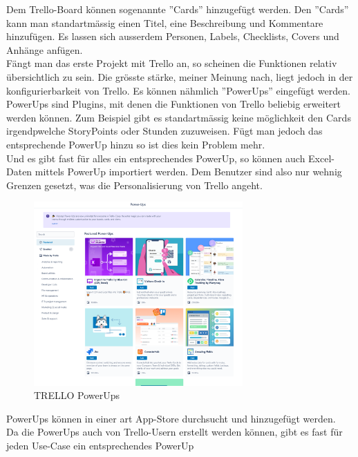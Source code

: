 Dem Trello-Board können sogenannte ''Cards'' hinzugefügt werden. Den ''Cards'' kann man standartmässig
einen Titel, eine Beschreibung und Kommentare hinzufügen. Es lassen sich ausserdem
Personen, Labels, Checklists, Covers und Anhänge anfügen.\\
Fängt man das erste Projekt mit Trello an, so scheinen die Funktionen relativ übersichtlich zu sein.
Die grösste stärke, meiner Meinung nach, liegt jedoch in der konfigurierbarkeit von Trello. Es können nähmlich
''PowerUps'' eingefügt werden. PowerUps sind Plugins, mit denen die Funktionen von Trello beliebig erweitert werden können.
Zum Beispiel gibt es standartmässig keine möglichkeit den Cards irgendpwelche StoryPoints oder Stunden zuzuweisen.
Fügt man jedoch das entsprechende PowerUp hinzu so ist dies kein Problem mehr.\\
Und es gibt fast für alles ein entsprechendes PowerUp, so können auch Excel-Daten mittels PowerUp importiert werden.
Dem Benutzer sind also nur wehnig Grenzen gesetzt, was die Personalisierung von Trello angeht.\\

\begin{figure}[H]
    \begin{center}
        \includegraphics[width=8cm]{../content/images/Trello/PowerUps.png}
        \caption{TRELLO PowerUps}
    \end{center}
\end{figure}

PowerUps können in einer art App-Store durchsucht und hinzugefügt werden.\\
Da die PowerUps auch von Trello-Usern erstellt werden können, gibt es fast für jeden Use-Case ein entsprechendes PowerUp
 
